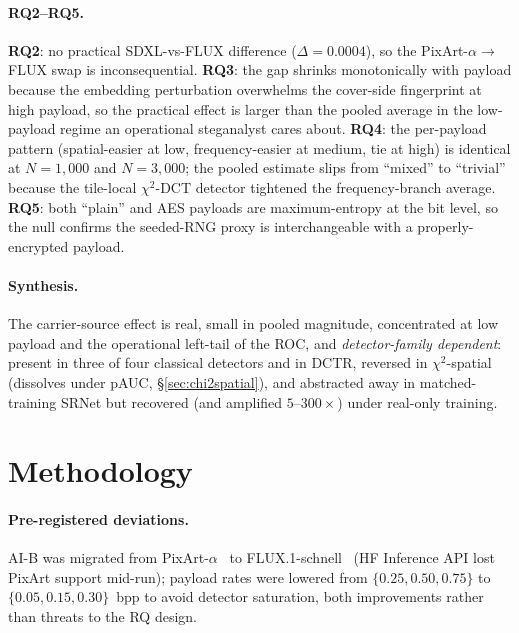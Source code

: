 \documentclass[10pt,twocolumn,a4paper]{article}
\DeclareRobustCommand{\by}[1]{\textnormal{\normalfont\footnotesize\space--- #1}}
\begin{document}
\paragraph{RQ2--RQ5.} \textbf{RQ2}: no practical SDXL-vs-FLUX difference ($\Delta\!=\!0.0004$), so the PixArt-$\alpha\!\to$\,FLUX swap is inconsequential. \textbf{RQ3}: the gap shrinks monotonically with payload because the embedding perturbation overwhelms the cover-side fingerprint at high payload, so the practical effect is larger than the pooled average in the low-payload regime an operational steganalyst cares about. \textbf{RQ4}: the per-payload pattern (spatial-easier at low, frequency-easier at medium, tie at high) is identical at $N\!=\!1{,}000$ and $N\!=\!3{,}000$; the pooled estimate slips from ``mixed'' to ``trivial'' because the tile-local $\chi^2$-DCT detector tightened the frequency-branch average. \textbf{RQ5}: both ``plain'' and AES payloads are maximum-entropy at the bit level, so the null confirms the seeded-RNG proxy is interchangeable with a properly-encrypted payload.

\paragraph{Synthesis.} The carrier-source effect is real, small in pooled magnitude, concentrated at low payload and the operational left-tail of the ROC, and \emph{detector-family dependent}: present in three of four classical detectors and in DCTR, reversed in $\chi^2$-spatial (dissolves under pAUC, \S\ref{sec:chi2spatial}), and abstracted away in matched-training SRNet but recovered (and amplified $5$--$300\times$) under real-only training.

\section[Limitations\by{\textbf{Writer:} Daria Gjonbalaj  \textbf{Reviewer:} Nico \textbf{Contributor:}  Abdul}]{Methodology}
\label{sec:limitations}

\paragraph{Pre-registered deviations.} AI-B was migrated from PixArt-$\alpha$~\cite{pixart2023} to FLUX.1-schnell~\cite{flux2024} (HF Inference API lost PixArt support mid-run); payload rates were lowered from $\{0.25,0.50,0.75\}$ to $\{0.05,0.15,0.30\}$~bpp to avoid detector saturation, both improvements rather than threats to the RQ design.
\end{document}
